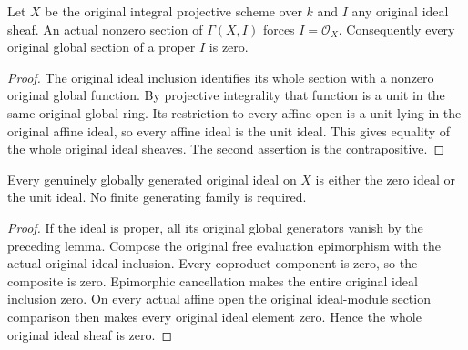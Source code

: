 \begin{lemma}
\label{lem:fc-original-projective-ideal-global-sections}
\leanok
{}
Let $X$ be the original integral projective scheme over $k$ and $I$ any
original ideal sheaf.  An actual nonzero section of
$\Gamma(X,I)$ forces $I=\mathcal O_X$.  Consequently every original
global section of a proper $I$ is zero.
\end{lemma}
\begin{proof}
The original ideal inclusion identifies its whole section with a nonzero
original global function.  By projective integrality that function is a
unit in the same original global ring.  Its restriction to every affine
open is a unit lying in the original affine ideal, so every affine ideal
is the unit ideal.  This gives equality of the whole original ideal
sheaves.  The second assertion is the contrapositive.
\end{proof}

\begin{theorem}
\label{thm:fc-original-generated-projective-ideal-zero-or-unit}
\leanok
{}
Every genuinely globally generated original ideal on $X$ is either the
zero ideal or the unit ideal.  No finite generating family is required.
\end{theorem}
\begin{proof}
If the ideal is proper, all its original global generators vanish by the
preceding lemma.  Compose the original free evaluation epimorphism with
the actual original ideal inclusion.  Every coproduct component is zero,
so the composite is zero.  Epimorphic cancellation makes the entire
original ideal inclusion zero.  On every actual affine open the original
ideal-module section comparison then makes every original ideal element
zero.  Hence the whole original ideal sheaf is zero.
\end{proof}
